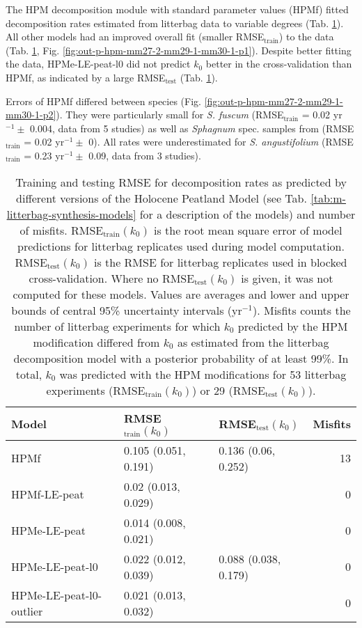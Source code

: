 \documentclass[esd, manuscript]{copernicus}
\begin{document}
The HPM decomposition module with standard parameter values (HPMf) fitted decomposition rates estimated from litterbag data to variable degrees (Tab. \ref{tab:out-tab-sdm-all-models-rmse-1}). All other models had an improved overall fit (smaller RMSE\(_\text{train}\)) to the data (Tab. \ref{tab:out-tab-sdm-all-models-rmse-1}, Fig. \ref{fig:out-p-hpm-mm27-2-mm29-1-mm30-1-p1}). Despite better fitting the data, HPMe-LE-peat-l0 did not predict \(k_0\) better in the cross-validation than HPMf, as indicated by a large RMSE\(_\text{test}\) (Tab. \ref{tab:out-tab-sdm-all-models-rmse-1}).

Errors of HPMf differed between species (Fig. \ref{fig:out-p-hpm-mm27-2-mm29-1-mm30-1-p2}). They were particularly small for \emph{S. fuscum} (RMSE\(_\text{train}\) = 0.02 yr\(^{-1} \pm\) 0.004, data from 5 studies) as well as \emph{Sphagnum} spec. samples from \citet{Prevost.1997} (RMSE\(_\text{train}\) = 0.02 yr\(^{-1} \pm\) 0). All rates were underestimated for \emph{S. angustifolium} (RMSE\(_\text{train}\) = 0.23 yr\(^{-1} \pm\) 0.09, data from 3 studies).



\begin{table}[!h]

\caption{\label{tab:out-tab-sdm-all-models-rmse-1}Training and testing RMSE for decomposition rates as predicted by different versions of the Holocene Peatland Model (see Tab. \ref{tab:m-litterbag-synthesis-models} for a description of the models) and number of misfits. RMSE\(_\text{train}(k_0)\) is the root mean square error of model predictions for litterbag replicates used during model computation. RMSE\(_\text{test}(k_0)\) is the RMSE for litterbag replicates used in blocked cross-validation. Where no RMSE\(_\text{test}(k_0)\) is given, it was not computed for these models. Values are averages and lower and upper bounds of central 95\% uncertainty intervals (yr\(^{-1}\)). Misfits counts the number of litterbag experiments for which \(k_0\) predicted by the HPM modification differed from \(k_0\) as estimated from the litterbag decomposition model with a posterior probability of at least 99\%. In total, \(k_0\) was predicted with the HPM modifications for 53 litterbag experiments (RMSE\(_\text{train}(k_0)\)) or 29 (RMSE\(_\text{test}(k_0)\)).}
\centering
\begin{tabular}[t]{lllr}
\toprule
Model & RMSE$_\text{train}(k_0)$ & RMSE$_\text{test}(k_0)$ & Misfits\\
\midrule
HPMf & 0.105 (0.051, 0.191) & 0.136 (0.06, 0.252) & 13\\
HPMf-LE-peat & 0.02 (0.013, 0.029) &  & 0\\
HPMe-LE-peat & 0.014 (0.008, 0.021) &  & 0\\
HPMe-LE-peat-l0 & 0.022 (0.012, 0.039) & 0.088 (0.038, 0.179) & 0\\
HPMe-LE-peat-l0-outlier & 0.021 (0.013, 0.032) &  & 0\\
\bottomrule
\end{tabular}
\end{table}
\end{document}
